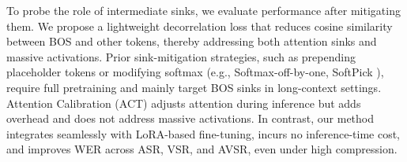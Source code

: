 \documentclass{article}
\begin{document}
To probe the role of intermediate sinks, we evaluate performance after mitigating them. We propose a lightweight decorrelation loss that reduces cosine similarity between BOS and other tokens, thereby addressing both attention sinks and massive activations. Prior sink-mitigation strategies, such as prepending placeholder tokens or modifying softmax (e.g., Softmax-off-by-one, SoftPick \cite{xiao2023streamingllm, zuhri2025softpick}), require full pretraining and mainly target BOS sinks in long-context settings. Attention Calibration (ACT) \cite{yu2024unveiling} adjusts attention during inference but adds overhead and does not address massive activations. In contrast, our method integrates seamlessly with LoRA-based fine-tuning, incurs no inference-time cost, and improves WER across ASR, VSR, and AVSR, even under high compression.
\end{document}
